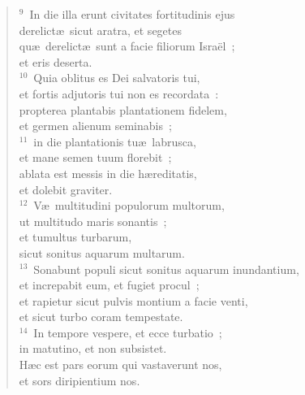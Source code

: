 \begin{flushleft}
\begin{verse}
${}^{9}$~In die illa erunt civitates fortitudinis ejus\\ derelict\ae\ sicut aratra, et segetes\\ qu\ae\ derelict\ae\ sunt a facie filiorum Isra\"el~;\\ et eris deserta.\\
${}^{10}$~Quia oblitus es Dei salvatoris tui,\\ et fortis adjutoris tui non es recordata~:\\ propterea plantabis plantationem fidelem,\\ et germen alienum seminabis~;\\
${}^{11}$~in die plantationis tu\ae\ labrusca,\\ et mane semen tuum florebit~;\\ ablata est messis in die h\ae reditatis,\\ et dolebit graviter.\\
${}^{12}$~V\ae\ multitudini populorum multorum,\\ ut multitudo maris sonantis~;\\ et tumultus turbarum,\\ sicut sonitus aquarum multarum.\\
${}^{13}$~Sonabunt populi sicut sonitus aquarum inundantium,\\ et increpabit eum, et fugiet procul~;\\ et rapietur sicut pulvis montium a facie venti,\\ et sicut turbo coram tempestate.\\
${}^{14}$~In tempore vespere, et ecce turbatio~;\\ in matutino, et non subsistet.\\ H\ae c est pars eorum qui vastaverunt nos,\\ et sors diripientium nos.\end{verse}\end{flushleft}


